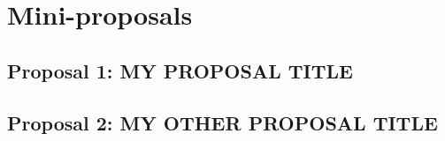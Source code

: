 

\section{Mini-proposals}

\subsection{Proposal 1: MY PROPOSAL TITLE} %


\subsection{Proposal 2: MY OTHER PROPOSAL TITLE} %



